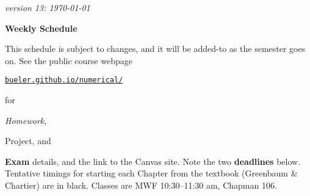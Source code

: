 \documentclass[12pt]{article}
\newcommand{\due}[1]{\strut {\color{BrickRed} \textsl{#1}}}
\newcommand{\proj}[1]{\strut {\color{RedOrange} #1}}
\newcommand{\ee}[1]{\strut {\color{Blue} \textbf{#1}}}
\newcommand{\dlinline}[1]{{\color{Purple} \textbf{#1}}}
\newcommand{\dl}[1]{{\small \dlinline{#1}}}
\begin{document}
\hfill \small \emph{version 13: \today} \normalsize

\bigskip\bigskip
\centerline{\Large \textbf{Weekly Schedule}}

\bigskip
This schedule is subject to changes, and it will be added-to as the semester goes on.  See the public course webpage

\medskip

\centerline{\href{https://bueler.github.io/numerical/index.html}{\texttt{bueler.github.io/numerical/}}}

\noindent for \due{Homework}, \proj{Project}, and \ee{Exam} details, and the link to the Canvas site.  Note the two \dl{deadlines} below.  Tentative timings for starting each Chapter from the textbook (Greenbaum \& Chartier) are in black.  Classes are MWF 10:30--11:30 am, Chapman 106.

\bigskip
\end{document}
